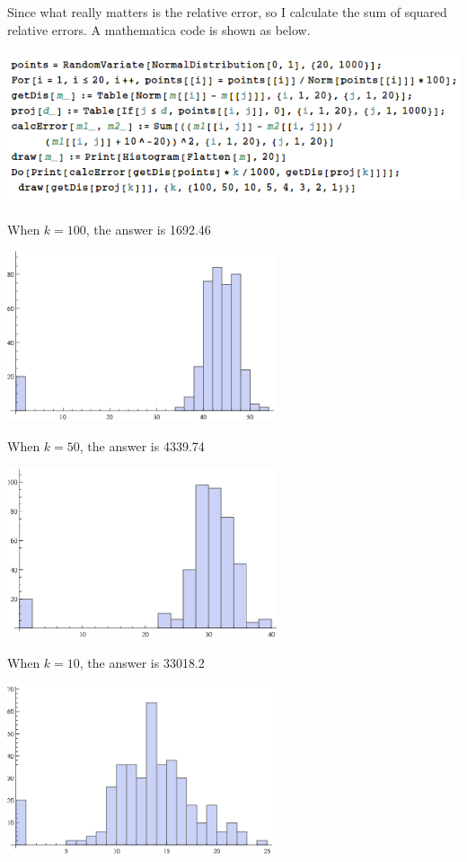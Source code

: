 \documentclass[a4paper, 12pt]{mcshw}
\begin{document}
\begin{enumerate}
    \begin{solution}
        Since what really matters is the relative error, so I calculate the sum of squared relative errors. A mathematica code is shown as below. 
        \begin{center}
            \includegraphics[height=4.5cm]{1.png}
        \end{center}
        When $k = 100$, the answer is 1692.46
        \begin{center}
            \includegraphics[height=5cm]{1_gr1.eps}
        \end{center}
        When $k = 50$, the answer is 4339.74
        \begin{center}
            \includegraphics[height=5cm]{1_gr2.eps}
        \end{center}
        When $k = 10$, the answer is 33018.2
        \begin{center}
            \includegraphics[height=5cm]{1_gr3.eps}

\end{center}
\end{solution}
\end{enumerate}
\end{document}
